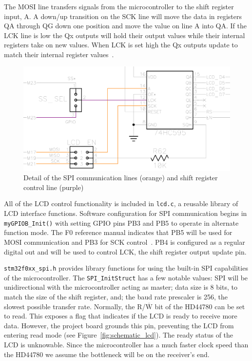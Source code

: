 The MOSI line transfers signals from the microcontroller to the shift register input, A.
A down/up transition on the SCK line will move the data in registers QA through QG down one position and move the value on line A into QA.
If the LCK line is low the Qx outputs will hold their output values while their internal registers take on new values.
When LCK is set high the Qx outputs update to match their internal register values~\cite{TI:HC595}.

\begin{figure}[tbph]
  \centering
  \includegraphics[width=0.7\linewidth]{../graphics/schematic_shift-reg}
  \caption{Detail of the SPI communication lines (orange) and shift register control line (purple)~\cite[p. 3]{schematic:PBMCUSLK}}
  \label{fig:schematic_shift-reg}
\end{figure}

All of the LCD control functionality is included in \texttt{lcd.c}, a reusable library of LCD interface functions.
Software configuration for SPI communication begins in \texttt{myGPIOB\_Init()} with setting GPIO pins PB3 and PB5 to operate in alternate function mode.
The F0 reference manual indicates that PB5 will be used for MOSI communication and PB3 for SCK control~\cite{STM:f0ref}.
PB4 is configured as a regular digital out and will be used to control LCK, the shift register output update pin.

\texttt{stm32f0xx\_spi.h} provides library functions for using the built-in SPI capabilities of the microcontroller.
The \texttt{SPI\_InitStruct} has a few notable values: SPI will be unidirectional with the microcontroller acting as master; data size is 8 bits, to match the size of the shift register, and; the baud rate prescaler is 256, the slowest possible transfer rate.
Normally, the R/$\overline{\text{W}}$ bit of the HD44780 can be set to read.
This exposes a flag that indicates if the LCD is ready to receive more data.
However, the project board grounds this pin, preventing the LCD from entering read mode (see Figure~\ref{fig:schematic_lcd}).
The ready status of the LCD is unknowable.
Since the microcontroller has a much faster clock speed than the HD44780 we assume the bottleneck will be on the receiver's end.

